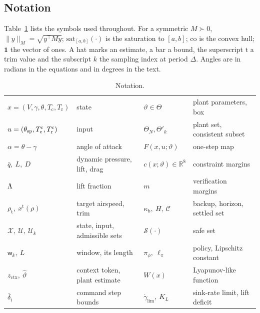 \documentclass[final,5p,times,twocolumn]{elsarticle}
\begin{document}
\subsection{Notation}
Table~\ref{tab:notation} lists the symbols used throughout. For a symmetric $M\succ0$, $\|y\|_M=\sqrt{y^{\!\top}My}$; $\mathrm{sat}_{[a,b]}(\cdot)$ is the saturation to $[a,b]$; $\mathrm{co}$ is the convex hull; $\mathbf 1$ the vector of ones. A hat marks an estimate, a bar a bound, the superscript $\mathrm t$ a trim value and the subscript $k$ the sampling index at period $\Delta$. Angles are in radians in the equations and in degrees in the text.
\begin{table}[t]\centering\footnotesize
\caption{Notation.}\label{tab:notation}
\setlength{\tabcolsep}{1.5pt}\scriptsize
\begin{tabular}{ll|ll}\toprule
$x=(V,\gamma,\theta,T_{\mathrm c},T_{\mathrm r})$ & state & $\vartheta\in\Theta$ & plant parameters, box\\
$u=(\theta_{\mathrm{sp}},T^{\mathrm c}_{\mathrm c},T^{\mathrm c}_{\mathrm r})$ & input & $\Theta_N,\Theta'_k$ & plant set, consistent subset\\
$\alpha=\theta-\gamma$ & angle of attack & $F(x,u;\vartheta)$ & one-step map\\
$\bar q,\ L,\ D$ & dynamic pressure, lift, drag & $c(x;\vartheta)\in\mathbb R^8$ & constraint margins\\
$\Lambda$ & lift fraction & $m$ & verification margins\\
$\rho_{\mathrm t},\ x^{\mathrm t}(\rho)$ & target airspeed, trim & $\kappa_{\mathrm b},\ H,\ \mathcal C$ & backup, horizon, settled set\\
$\mathcal X,\ \mathcal U,\ \mathcal U_k$ & state, input, admissible sets & $\mathcal S(\cdot)$ & safe set\\
$\mathsf w_k,\ L$ & window, its length & $\pi_\phi,\ \ell_\pi$ & policy, Lipschitz constant\\
$z_{\mathrm{ctx}},\ \hat\vartheta$ & context token, plant estimate & $W(x)$ & Lyapunov-like function\\
$\bar\delta_i$ & command step bounds & $\dot\gamma_{\lim},\ K_L$ & sink-rate limit, lift deficit\\
\bottomrule\end{tabular}\end{table}
\end{document}
